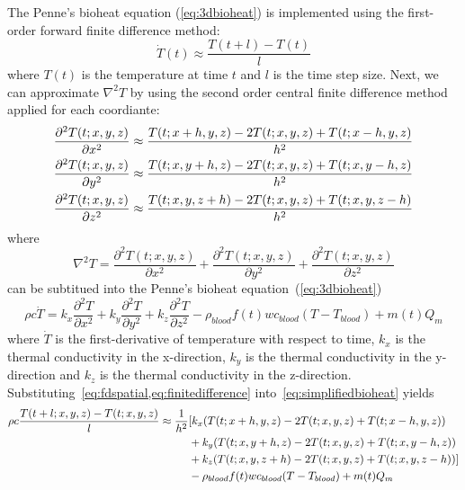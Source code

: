     The Penne's bioheat equation (\cref{eq:3dbioheat}) is implemented using the first-order forward finite difference method:
    \begin{equation}
      \label{eq:finitedifference}
      \dot{T}(t) \approx \frac{T(t+l)-T(t)}{l}
    \end{equation}
    where $T(t)$ is the temperature at time $t$ and $l$ is the time step size. Next, we can approximate $\nabla^{2} T$ by using the second order central finite difference method applied for each coordiante:
    \begin{align}
      \frac{\partial^2T(t;x,y,z)}{\partial x^2} &\approx \frac{T(t;x+h,y,z)-2 T(t;x,y,z)+T(t;x-h,y,z)}{h^2} \notag\\
      \frac{\partial^2T(t;x,y,z)}{\partial y^2} &\approx \frac{T(t;x,y+h,z)-2 T(t;x,y,z)+T(t;x,y-h,z)}{h^2} \notag\\
      \frac{\partial^2T(t;x,y,z)}{\partial z^2} &\approx \frac{T(t;x,y,z+h)-2 T(t;x,y,z)+T(t;x,y,z-h)}{h^2}\label{eq:fdspatial}
    \end{align}
where 
  \begin{equation}
    \label{eq:leplaceT}
    \nabla^{2} T = 
    \frac{\partial^2T(t;x,y,z)}{\partial x^2} + 
    \frac{\partial^2T(t;x,y,z)}{\partial y^2} + 
    \frac{\partial^2T(t;x,y,z)}{\partial z^2}
  \end{equation}
 can be subtitued into the Penne's bioheat equation~(\cref{eq:3dbioheat})
  \begin{equation}
    \rho c \dot{T} = k_x \frac{\partial^2 T}{\partial x^2} + k_y \frac{\partial^2 T}{\partial y^2} + k_z \frac{\partial^2 T}{\partial z^2} -\rho_{blood}f(t)wc_{blood}(T-T_{blood})+m(t)Q_{m} \label{eq:simplifiedbioheat}
  \end{equation}
  where $\dot{T}$ is the first-derivative of temperature with respect to time, $k_x$ is the thermal conductivity in the x-direction, $k_y$ is the thermal conductivity in the y-direction and $k_z$ is the thermal conductivity in the z-direction.
  Substituting~\cref{eq:fdspatial,eq:finitedifference} into~\cref{eq:simplifiedbioheat} yields
  \begin{align}
    \rho c \frac{T(t+l;x,y,z)-T(t;x,y,z)}{l} \approx \frac{1}{h^2} 
    & [k_x (T(t;x+h,y,z)-2 T(t;x,y,z)+T(t;x-h,y,z)) \notag\\
    & + k_y (T(t;x,y+h,z)-2 T(t;x,y,z)+T(t;x,y-h,z))\notag\\
    & + k_z (T(t;x,y,z+h)-2 T(t;x,y,z)+T(t;x,y,z-h))]\notag\\
    & -\rho_{blood}f(t)wc_{blood}(T-T_{blood})+m(t)Q_{m}
  \end{align}
